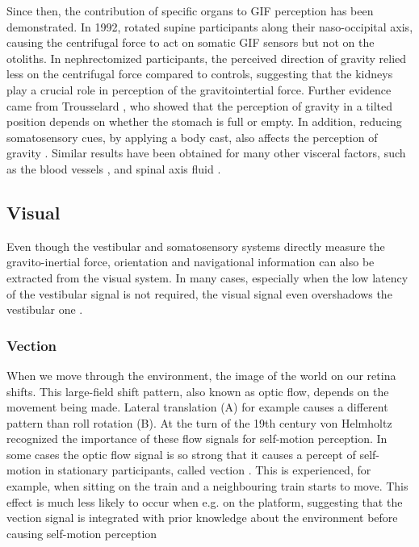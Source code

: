 Since then, the contribution of specific organs to GIF perception has been demonstrated. In 1992, \citeauthor{mittelstaedt1992} rotated supine participants along  their naso-occipital axis,  causing  the centrifugal force to act on somatic GIF sensors  but not on the otoliths. In nephrectomized participants, the perceived direction of gravity relied less on the centrifugal force compared to controls, suggesting that the kidneys play a crucial role in perception of the gravitointertial force. Further evidence came from Trousselard \citeyear{trousselard2004}, who showed that the perception of gravity in a tilted position depends on whether the stomach is full or empty. In addition, reducing somatosensory cues, by applying a body cast, also affects the perception of gravity \cite{trousselard2004}.  Similar results have been obtained for many other visceral factors, such as the blood vessels \cite{vaitl2002}, and spinal axis fluid \cite{vaitl1997}.


\subsection{Visual}
Even though the vestibular and somatosensory systems directly measure the gravito-inertial force, orientation and navigational information can also be extracted from the visual system. In many cases, especially when the low latency of the vestibular signal is not required, the visual signal even overshadows the vestibular one \cite{wright2005,gaerlan2012}.

\subsubsection{Vection}
When we move through the environment, the image of the world on our retina shifts. This large-field shift pattern, also known as optic flow, depends on the movement being made. Lateral translation (A) for example causes a different pattern than roll rotation (B). At the turn of the 19th century von Helmholtz \citeyear{vonhelmholtz1867} recognized the importance of these flow signals for self-motion perception. In some cases the optic flow signal is so strong that it causes a percept of self-motion in stationary participants, called vection \cite{dichgans1978}. This is experienced, for example, when sitting on the train and a neighbouring train starts to move. This effect is much less likely to occur when e.g. on the platform, suggesting that the vection signal is integrated with prior knowledge about the environment before causing self-motion perception \cite{andersen1985,lepecq1995}


